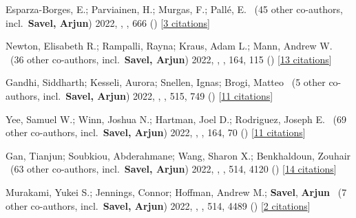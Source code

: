 \item[{\color{numcolor}\scriptsize16}] Esparza-Borges, E.; Parviainen, H.; Murgas, F.; Pall{\'e}, E. \etal\ ({45} other co-authors, incl.\ \textbf{Savel, Arjun}) 2022, , \aanda, {666} () [\href{https://ui.adsabs.harvard.edu/abs/2022A&A...666A..10E}{3 citations}]

\item[{\color{numcolor}\scriptsize15}] Newton, Elisabeth R.; Rampalli, Rayna; Kraus, Adam L.; Mann, Andrew W. \etal\ ({36} other co-authors, incl.\ \textbf{Savel, Arjun}) 2022, , \aj, {164}, 115 () [\href{https://ui.adsabs.harvard.edu/abs/2022AJ....164..115N}{13 citations}]

\item[{\color{numcolor}\scriptsize14}] Gandhi, Siddharth; Kesseli, Aurora; Snellen, Ignas; Brogi, Matteo \etal\ ({5} other co-authors, incl.\ \textbf{Savel, Arjun}) 2022, , \mnras, {515}, 749 () [\href{https://ui.adsabs.harvard.edu/abs/2022MNRAS.515..749G}{11 citations}]

\item[{\color{numcolor}\scriptsize13}] Yee, Samuel W.; Winn, Joshua N.; Hartman, Joel D.; Rodriguez, Joseph E. \etal\ ({69} other co-authors, incl.\ \textbf{Savel, Arjun}) 2022, , \aj, {164}, 70 () [\href{https://ui.adsabs.harvard.edu/abs/2022AJ....164...70Y}{11 citations}]

\item[{\color{numcolor}\scriptsize12}] Gan, Tianjun; Soubkiou, Abderahmane; Wang, Sharon X.; Benkhaldoun, Zouhair \etal\ ({63} other co-authors, incl.\ \textbf{Savel, Arjun}) 2022, , \mnras, {514}, 4120 () [\href{https://ui.adsabs.harvard.edu/abs/2022MNRAS.514.4120G}{14 citations}]

\item[{\color{numcolor}\scriptsize11}] Murakami, Yukei S.; Jennings, Connor; Hoffman, Andrew M.; \textbf{Savel}, \textbf{Arjun} \etal\ ({7} other co-authors, incl.\ \textbf{Savel, Arjun}) 2022, , \mnras, {514}, 4489 () [\href{https://ui.adsabs.harvard.edu/abs/2022MNRAS.514.4489M}{2 citations}]

